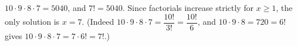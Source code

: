 $10\cdot9\cdot8\cdot7=5040$, and $7!=5040$. Since factorials increase strictly for $x\ge1$, the only solution is $x=\boxed{7}$. (Indeed $10\cdot9\cdot8\cdot7=\dfrac{10!}{3!}=\dfrac{10!}{6}$, and $10\cdot9\cdot8=720=6!$ gives $10\cdot9\cdot8\cdot7=7\cdot6!=7!$.)
